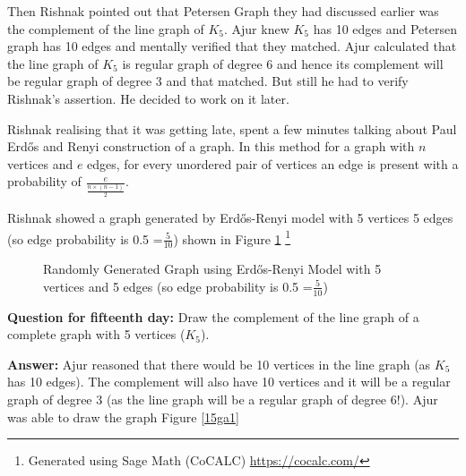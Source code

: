 Then Rishnak pointed out that Petersen Graph they had discussed earlier was the complement of the line graph of $K_5$. Ajur knew $K_5$ has 10 edges and Petersen graph has 10 edges and mentally verified that they matched. Ajur calculated that the line graph of $K_5$ is regular graph of degree 6 and hence its complement will be regular graph of degree 3 and that matched. But still he had to verify Rishnak's assertion. He decided to work on it later.

Rishnak realising that it was getting late, spent a few minutes talking about Paul Erd\H{o}s and Renyi construction of a graph. In this method for a graph with $n$ vertices and $e$ edges, for every unordered pair of vertices  an edge is present with a probability of $\frac{e}{\frac{n \times (n-1)}{2}}$. 


Rishnak showed a graph generated by Erd\H{o}s-Renyi model with 5 vertices 5 edges (so edge probability is 0.5  =$ \frac{5}{10}$) shown in Figure \ref {17g9} \footnote{Generated using Sage Math (CoCALC) \url{https://cocalc.com/}}
\begin{figure}
\begin{center}
\caption{ Randomly Generated Graph using Erd\H{o}s-Renyi Model with 5 vertices and 5 edges (so edge probability is 0.5  =$ \frac{5}{10}$)  }\label{17g9}
\end{center}
\end{figure}

\textbf{Question for fifteenth day:} Draw the complement of the line graph of a complete graph with 5 vertices ($K_5$).

\textbf{Answer:} Ajur reasoned that there would be 10 vertices in the line graph (as $K_5$ has 10 edges). The complement will also have 10 vertices and it will be a regular graph of degree 3 (as the line graph will be a regular graph of degree 6!). Ajur was able to draw the graph Figure \ref{15ga1}

